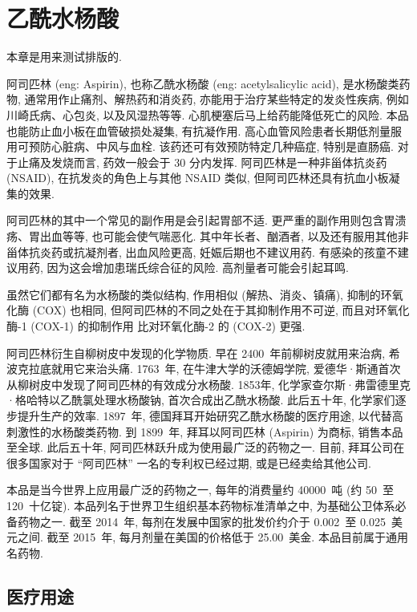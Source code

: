 \chapter{乙酰水杨酸}

\begin{remark*}
    本章是用来测试排版的.
\end{remark*}

阿司匹林 (\gls{eng}: Aspirin),
也称乙酰水杨酸 (\gls{eng}: acetylsalicylic acid),
是水杨酸类药物,
通常用作止痛剂、解热药和消炎药,
亦能用于治疗某些特定的发炎性疾病,
例如川崎氏病、心包炎, 以及风湿热等等.
心肌梗塞后马上给药能降低死亡的风险.
本品也能防止血小板在血管破损处凝集, 有抗凝作用.
高心血管风险患者长期低剂量服用可预防心脏病、中风与血栓.
该药还可有效预防特定几种癌症, 特别是直肠癌.
对于止痛及发烧而言, 药效一般会于 30 分内发挥.
阿司匹林是一种非甾体抗炎药 (NSAID),
在抗发炎的角色上与其他 NSAID 类似,
但阿司匹林还具有抗血小板凝集的效果.

阿司匹林的其中一个常见的副作用是会引起胃部不适.
更严重的副作用则包含胃溃疡、胃出血等等, 也可能会使气喘恶化.
其中年长者、酗酒者, 以及还有服用其他非甾体抗炎药或抗凝剂者,
出血风险更高, 妊娠后期也不建议用药.
有感染的孩童不建议用药, 因为这会增加患瑞氏综合征的风险.
高剂量者可能会引起耳鸣.

虽然它们都有名为水杨酸的类似结构,
作用相似 (解热、消炎、镇痛),
抑制的环氧化酶 (COX) 也相同,
但阿司匹林的不同之处在于其抑制作用不可逆,
而且对环氧化酶-1 (COX-1) 的抑制作用%
比对环氧化酶-2 的 (COX-2) 更强.

阿司匹林衍生自柳树皮中发现的化学物质.
早在 \num{2400}~年前柳树皮就用来治病,
希波克拉底就用它来治头痛.
1763~年, 在牛津大学的沃德姆学院,
爱德华·斯通首次从柳树皮中发现了阿司匹林的有效成分水杨酸.
1853年, 化学家查尔斯·弗雷德里克·格哈特以乙酰氯处理水杨酸钠,
首次合成出乙酰水杨酸.
此后五十年, 化学家们逐步提升生产的效率.
1897~年, 德国拜耳开始研究乙酰水杨酸的医疗用途,
以代替高刺激性的水杨酸类药物.
到 1899~年, 拜耳以阿司匹林 (Aspirin) 为商标, 销售本品至全球.
此后五十年, 阿司匹林跃升成为使用最广泛的药物之一.
目前, 拜耳公司在很多国家对于 ``阿司匹林'' 一名的专利权已经过期,
或是已经卖给其他公司.

本品是当今世界上应用最广泛的药物之一,
每年的消费量约 \num{40000}~吨 (约 50~至 120~十亿锭).
本品列名于世界卫生组织基本药物标准清单之中,
为基础公卫体系必备药物之一.
截至 2014~年, 每剂在发展中国家的批发价约介于
0.002~至 0.025~美元之间.
截至 2015~年, 每月剂量在美国的价格低于 25.00~美金.
本品目前属于通用名药物.

\section{医疗用途}

